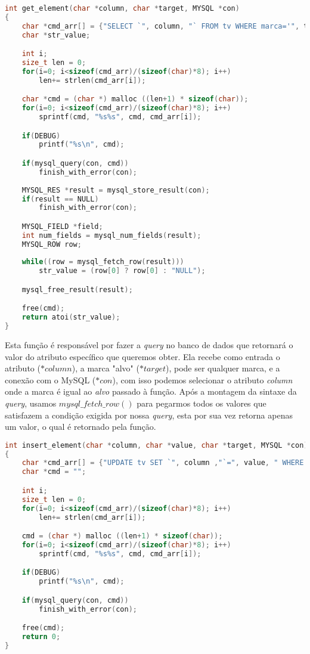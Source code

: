 \begin{lstlisting}[language=c, caption={fun\c{c}\~{a}o $get\_element()$}, label={lst:dbphi2}]
int get_element(char *column, char *target, MYSQL *con)
{
	char *cmd_arr[] = {"SELECT `", column, "` FROM tv WHERE marca='", target, "'"};
	char *str_value;

	int i;
	size_t len = 0;
	for(i=0; i<sizeof(cmd_arr)/(sizeof(char)*8); i++)
		len+= strlen(cmd_arr[i]);

	char *cmd = (char *) malloc ((len+1) * sizeof(char));
	for(i=0; i<sizeof(cmd_arr)/(sizeof(char)*8); i++)
		sprintf(cmd, "%s%s", cmd, cmd_arr[i]);

	if(DEBUG)
		printf("%s\n", cmd);

	if(mysql_query(con, cmd))
		finish_with_error(con);
   
	MYSQL_RES *result = mysql_store_result(con);
	if(result == NULL)
		finish_with_error(con);

	MYSQL_FIELD *field;
	int num_fields = mysql_num_fields(result);
	MYSQL_ROW row;
	
	while((row = mysql_fetch_row(result)))
		str_value = (row[0] ? row[0] : "NULL");

	mysql_free_result(result);

	free(cmd);
	return atoi(str_value);
}
\end{lstlisting}

Esta fun\c{c}\~{a}o \'{e} respons\'{a}vel por fazer a \textit{query} no banco de
dados que retornar\'{a} o valor do atributo espec\'{i}fico que queremos obter.
Ela recebe como entrada o atributo (\textit{$*column$}), a marca "alvo"
(\textit{$*target$}), pode ser qualquer marca, e a conex\~{a}o com o MySQL
(\textit{$*con$}), com isso podemos selecionar o atributo \textit{column} onde a
marca \'{e} igual ao \textit{alvo} passado \`{a} fun\c{c}\~{a}o. Ap\'{o}s a
montagem da sintaxe da \textit{query}, usamos \textit{$mysql\_fetch\_row()$}
para pegarmos todos os valores que satisfazem a condi\c{c}\~{a}o exigida por
nossa \textit{query}, esta por sua vez retorna apenas um valor, o qual \'{e}
retornado pela fun\c{c}\~{a}o.

\begin{lstlisting}[language=c, caption={fun\c{c}\~{a}o $insert\_element()$}, label={lst:dbphi3}]
int insert_element(char *column, char *value, char *target, MYSQL *con)
{
	char *cmd_arr[] = {"UPDATE tv SET `", column ,"`=", value, " WHERE marca='", target, "'"};
	char *cmd = "";

	int i;
	size_t len = 0;
	for(i=0; i<sizeof(cmd_arr)/(sizeof(char)*8); i++)
		len+= strlen(cmd_arr[i]);

	cmd = (char *) malloc ((len+1) * sizeof(char));
	for(i=0; i<sizeof(cmd_arr)/(sizeof(char)*8); i++)
		sprintf(cmd, "%s%s", cmd, cmd_arr[i]);

	if(DEBUG)
		printf("%s\n", cmd);

	if(mysql_query(con, cmd))
		finish_with_error(con);

	free(cmd);
	return 0;
}
\end{lstlisting}

